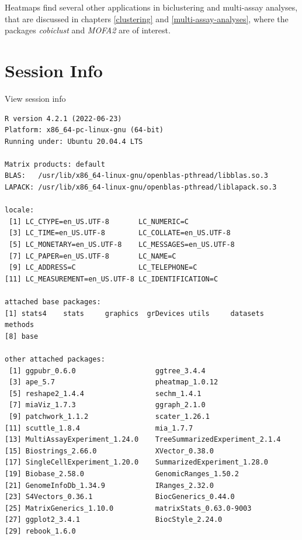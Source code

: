 \documentclass[
]{book}
\begin{document}
Heatmaps find several other applications in biclustering and multi-assay
analyses, that are discussed in chapters \ref{clustering} and
\ref{multi-assay-analyses}, where the packages \emph{cobiclust} and \emph{MOFA2} are of interest.

\hypertarget{session-info-10}{%
\section*{Session Info}\label{session-info-10}}

View session info

\begin{verbatim}
R version 4.2.1 (2022-06-23)
Platform: x86_64-pc-linux-gnu (64-bit)
Running under: Ubuntu 20.04.4 LTS

Matrix products: default
BLAS:   /usr/lib/x86_64-linux-gnu/openblas-pthread/libblas.so.3
LAPACK: /usr/lib/x86_64-linux-gnu/openblas-pthread/liblapack.so.3

locale:
 [1] LC_CTYPE=en_US.UTF-8       LC_NUMERIC=C              
 [3] LC_TIME=en_US.UTF-8        LC_COLLATE=en_US.UTF-8    
 [5] LC_MONETARY=en_US.UTF-8    LC_MESSAGES=en_US.UTF-8   
 [7] LC_PAPER=en_US.UTF-8       LC_NAME=C                 
 [9] LC_ADDRESS=C               LC_TELEPHONE=C            
[11] LC_MEASUREMENT=en_US.UTF-8 LC_IDENTIFICATION=C       

attached base packages:
[1] stats4    stats     graphics  grDevices utils     datasets  methods  
[8] base     

other attached packages:
 [1] ggpubr_0.6.0                   ggtree_3.4.4                  
 [3] ape_5.7                        pheatmap_1.0.12               
 [5] reshape2_1.4.4                 sechm_1.4.1                   
 [7] miaViz_1.7.3                   ggraph_2.1.0                  
 [9] patchwork_1.1.2                scater_1.26.1                 
[11] scuttle_1.8.4                  mia_1.7.7                     
[13] MultiAssayExperiment_1.24.0    TreeSummarizedExperiment_2.1.4
[15] Biostrings_2.66.0              XVector_0.38.0                
[17] SingleCellExperiment_1.20.0    SummarizedExperiment_1.28.0   
[19] Biobase_2.58.0                 GenomicRanges_1.50.2          
[21] GenomeInfoDb_1.34.9            IRanges_2.32.0                
[23] S4Vectors_0.36.1               BiocGenerics_0.44.0           
[25] MatrixGenerics_1.10.0          matrixStats_0.63.0-9003       
[27] ggplot2_3.4.1                  BiocStyle_2.24.0              
[29] rebook_1.6.0                  


\end{verbatim}
\end{document}
